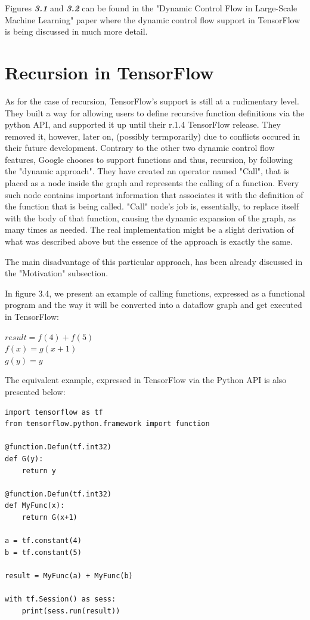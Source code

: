 \documentclass[ack,preface]{dithesis}
\begin{document}
Figures \textit{\textbf{3.1}} and \textit{\textbf{3.2}}  can be found in the "Dynamic Control Flow in Large-Scale Machine Learning" paper  \cite{Yu:2018} where the dynamic control flow support in TensorFlow is being discussed in much more detail. 

\section{Recursion in TensorFlow}
As for the case of recursion, TensorFlow's support is still at a rudimentary level. They built a way for allowing users to define recursive function definitions via the python API,  and supported it up until their r.1.4 TensorFlow release. They removed it, however, later on, (possibly termporarily) due to conflicts occured in their future development. Contrary to the other two dynamic control flow features, Google chooses to support functions and thus, recursion, by following the "dynamic approach".  They have created an operator named "Call", that is placed as a node inside the graph and represents the calling of a function. Every such node contains important information that associates it with the definition  of the function that is being called.  "Call" node's job is, essentially,  to replace itself with the body of that function, causing the dynamic expansion of the graph, as many times as needed. The real implementation might be a slight derivation of what was described above but the essence of the approach is exactly the same.

The main disadvantage of this particular approach, has been already discussed in the "Motivation" subsection.

\begin{flushleft}
  In figure 3.4, we present an example of calling functions, expressed as a functional program and the way it will be converted into a dataflow graph and get executed in TensorFlow:

 \setlength{\parindent}{25ex} $result = f(4) + f(5)$ \\
$f(x) = g(x+1)$ \\ 
$g(y) = y$
\end{flushleft}

The equivalent example, expressed in TensorFlow via the Python API is also presented below:
\begin{lstlisting}
import tensorflow as tf
from tensorflow.python.framework import function

@function.Defun(tf.int32)
def G(y):
	return y

@function.Defun(tf.int32)
def MyFunc(x):
	return G(x+1)

a = tf.constant(4)
b = tf.constant(5)

result = MyFunc(a) + MyFunc(b)

with tf.Session() as sess:
	print(sess.run(result))
\end{lstlisting}
\end{document}
